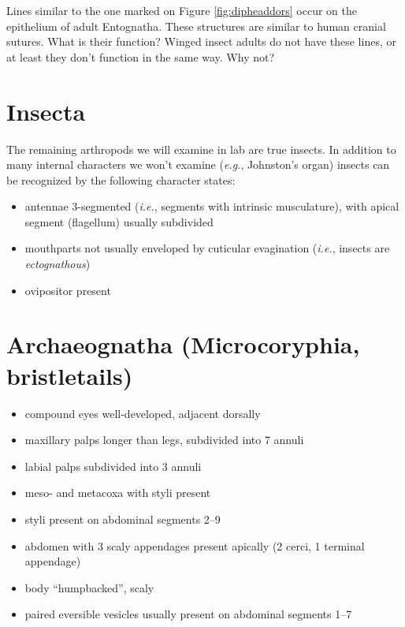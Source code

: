 \documentclass[letterpaper, 11pt]{article}
\begin{document}
\noindent{}Lines similar to the one marked on Figure \ref{fig:dipheaddors} occur on the epithelium of adult Entognatha. These structures are similar to human cranial sutures. What is their function? Winged insect adults do not have these lines, or at least they don't function in the same way. Why not?\vspace{3cm}

\section*{Insecta}
The remaining arthropods we will examine in lab are true insects. In addition to many internal characters we won't examine (\textit{e.g.}, Johnston's organ) insects can be recognized by the following character states:
\begin{itemize}
\item antennae 3-segmented (\textit{i.e.}, segments with intrinsic musculature), with apical segment (flagellum) usually subdivided
\item mouthparts not usually enveloped by cuticular evagination (\textit{i.e.}, insects are \textit{ectognathous})
\item ovipositor present
\end{itemize}

\section{Archaeognatha (Microcoryphia, bristletails)}
\begin{itemize}
\item compound eyes well-developed, adjacent dorsally
\item maxillary palps longer than legs, subdivided into 7 annuli
\item labial palps subdivided into 3 annuli
\item meso- and metacoxa with styli present
\item styli present on abdominal segments 2--9
\item abdomen with 3 scaly appendages present apically (2 cerci, 1 terminal appendage)
\item body ``humpbacked'', scaly
\item paired eversible vesicles usually present on abdominal segments 1--7
\end{itemize}
\end{document}

